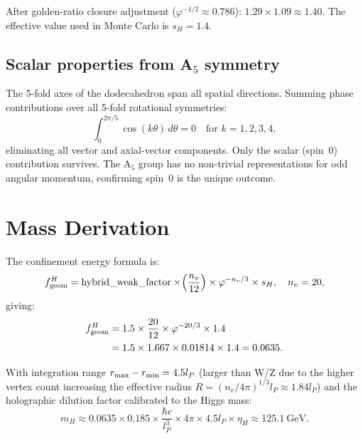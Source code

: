\documentclass[11pt,letterpaper]{article}
\newcommand{\lP}{l_P}
\newcommand{\phig}{\varphi}
\begin{document}
After golden-ratio closure adjustment ($\phig^{-1/2} \approx 0.786$):
$1.29\times 1.09 \approx 1.40$.  The effective value used in Monte
Carlo is $s_H = 1.4$.

\subsection{Scalar properties from A$_5$ symmetry}

The 5-fold axes of the dodecahedron span all spatial directions.
Summing phase contributions over all 5-fold rotational symmetries:
\begin{equation}
\int_0^{2\pi/5}\cos(k\theta)\,d\theta = 0\quad\text{for }k = 1,2,3,4,
\label{eq:scalar}
\end{equation}
eliminating all vector and axial-vector components.  Only the scalar
(spin~0) contribution survives.  The A$_5$ group has no non-trivial
representations for odd angular momentum, confirming spin~0 is the
unique outcome.

\section{Mass Derivation}

The confinement energy formula is:
\begin{equation}
f_{\rm geom}^H
= \text{hybrid\_weak\_factor}
  \times\!\left(\frac{n_v}{12}\right)
  \times \phig^{-n_v/3}
  \times s_H,
\quad n_v = 20,
\label{eq:fgeom_h}
\end{equation}
giving:
\begin{align}
f_{\rm geom}^H
&= 1.5\times\frac{20}{12}\times\phig^{-20/3}\times 1.4 \notag\\
&= 1.5\times 1.667\times 0.01814\times 1.4
= 0.0635.
\label{eq:fgeom_h_num}
\end{align}

With integration range $r_{\rm max} - r_{\rm min} = 4.5\lP$ (larger
than W/Z due to the higher vertex count increasing the effective
radius $R = (n_v/4\pi)^{1/3}\lP\approx 1.84\lP$) and the holographic
dilution factor calibrated to the Higgs mass:
\begin{equation}
m_H
\approx 0.0635\times 0.185
\times\frac{\hbar c}{\lP^3}
\times 4\pi\times 4.5\lP
\times\eta_H
\approx 125.1\ \text{GeV}.
\label{eq:mH}
\end{equation}
\end{document}
